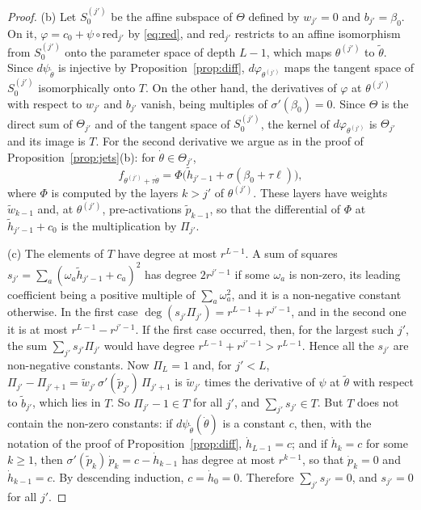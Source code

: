 \documentclass[11pt]{article}
\theoremstyle{definition}
\theoremstyle{remark}
\begin{document}
\begin{proof}
(b) Let $S_0^{(j')}$ be the affine subspace of $\Theta$ defined by $w_{j'}=0$ and $b_{j'}=\beta_0$. On it, $\varphi=c_0+\psi\circ\mathrm{red}_{j'}$ by \eqref{eq:red}, and $\mathrm{red}_{j'}$ restricts to an affine isomorphism from $S_0^{(j')}$ onto the parameter space of depth $L-1$, which maps $\theta^{(j')}$ to $\tilde\theta$. Since $d\psi_{\tilde\theta}$ is injective by Proposition~\ref{prop:diff}, $d\varphi_{\theta^{(j')}}$ maps the tangent space of $S_0^{(j')}$ isomorphically onto $T$. On the other hand, the derivatives of $\varphi$ at $\theta^{(j')}$ with respect to $w_{j'}$ and $b_{j'}$ vanish, being multiples of $\sigma'(\beta_0)=0$. Since $\Theta$ is the direct sum of $\Theta_{j'}$ and of the tangent space of $S_0^{(j')}$, the kernel of $d\varphi_{\theta^{(j')}}$ is $\Theta_{j'}$ and its image is $T$. For the second derivative we argue as in the proof of Proposition~\ref{prop:jets}(b): for $\dot\theta\in\Theta_{j'}$,
\[
f_{\theta^{(j')}+\tau\dot\theta}=\Phi\big(\tilde h_{j'-1}+\sigma(\beta_0+\tau\ell)\big),
\]
where $\Phi$ is computed by the layers $k>j'$ of $\theta^{(j')}$. These layers have weights $\tilde w_{k-1}$ and, at $\theta^{(j')}$, pre-activations $\tilde p_{k-1}$, so that the differential of $\Phi$ at $\tilde h_{j'-1}+c_0$ is the multiplication by $\Pi_{j'}$.

(c) The elements of $T$ have degree at most $r^{L-1}$. A sum of squares $s_{j'}=\sum_a(\omega_a\tilde h_{j'-1}+c_a)^2$ has degree $2r^{j'-1}$ if some $\omega_a$ is non-zero, its leading coefficient being a positive multiple of $\sum_a\omega_a^2$, and it is a non-negative constant otherwise. In the first case $\deg(s_{j'}\Pi_{j'})=r^{L-1}+r^{j'-1}$, and in the second one it is at most $r^{L-1}-r^{j'-1}$. If the first case occurred, then, for the largest such $j'$, the sum $\sum_{j'}s_{j'}\Pi_{j'}$ would have degree $r^{L-1}+r^{j'-1}>r^{L-1}$. Hence all the $s_{j'}$ are non-negative constants. Now $\Pi_L=1$ and, for $j'<L$, $\Pi_{j'}-\Pi_{j'+1}=\tilde w_{j'}\,\sigma'(\tilde p_{j'})\,\Pi_{j'+1}$ is $\tilde w_{j'}$ times the derivative of $\psi$ at $\tilde\theta$ with respect to $\tilde b_{j'}$, which lies in $T$. So $\Pi_{j'}-1\in T$ for all $j'$, and $\sum_{j'}s_{j'}\in T$. But $T$ does not contain the non-zero constants: if $d\psi_{\tilde\theta}(\dot\theta)$ is a constant $c$, then, with the notation of the proof of Proposition~\ref{prop:diff}, $\dot h_{L-1}=c$; and if $\dot h_k=c$ for some $k\ge1$, then $\sigma'(\tilde p_k)\,\dot p_k=c-\dot h_{k-1}$ has degree at most $r^{k-1}$, so that $\dot p_k=0$ and $\dot h_{k-1}=c$. By descending induction, $c=\dot h_0=0$. Therefore $\sum_{j'}s_{j'}=0$, and $s_{j'}=0$ for all $j'$.
\end{proof}
\end{document}
